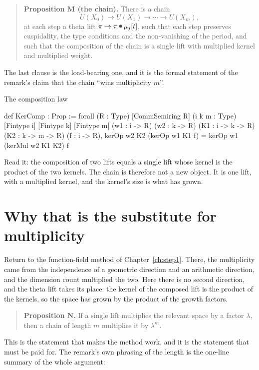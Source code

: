 \begin{quote}
\textbf{Proposition M (the chain).} There is a chain
\[
U(X_0) \longrightarrow U(X_1) \longrightarrow \cdots \longrightarrow U(X_m),
\]
at each step a theta lift $\pi \mapsto \pi \tboxplus \mu_j[t]$, such that each
step preserves cuspidality, the type conditions and the non-vanishing of the
period, and such that the composition of the chain is a single lift with
multiplied kernel and multiplied weight.
\end{quote}

The last clause is the load-bearing one, and it is the formal statement of
the remark's claim that the chain ``wins multiplicity $m$''.

\begin{seamnote}{The composition law}
{\footnotesize
\begin{leanquote}
def KerComp : Prop :=
forall (R : Type) [CommSemiring R] (i k m : Type) [Fintype
    i] [Fintype k] [Fintype m]
(w1 : i -> R) (w2 : k -> R) (K1 : i -> k -> R) (K2 : k -> m
      -> R) (f : i -> R),
kerOp w2 K2 (kerOp w1 K1 f) = kerOp w1 (kerMul w2 K1 K2) f
\end{leanquote}
}
\end{seamnote}

Read it: the composition of two lifts equals a single lift whose kernel is
the product of the two kernels. The chain is therefore not a new object. It is
one lift, with a multiplied kernel, and the kernel's size is what has grown.

\section{Why that is the substitute for multiplicity}Return to the function-field method of Chapter~\ref{ch:step1}. There, the
multiplicity came from the independence of a geometric direction and an
arithmetic direction, and the dimension count multiplied the two. Here there
is no second direction, and the theta lift takes its place: the kernel of the
composed lift is the product of the kernels, so the space has grown by the
product of the growth factors.

\begin{quote}
\textbf{Proposition N.} If a single lift multiplies the relevant space by a
factor $\lambda$, then a chain of length $m$ multiplies it by $\lambda^m$.
\end{quote}

This is the statement that makes the method work, and it is the statement that
must be paid for. The remark's own phrasing of the length is the one-line
summary of the whole argument:

